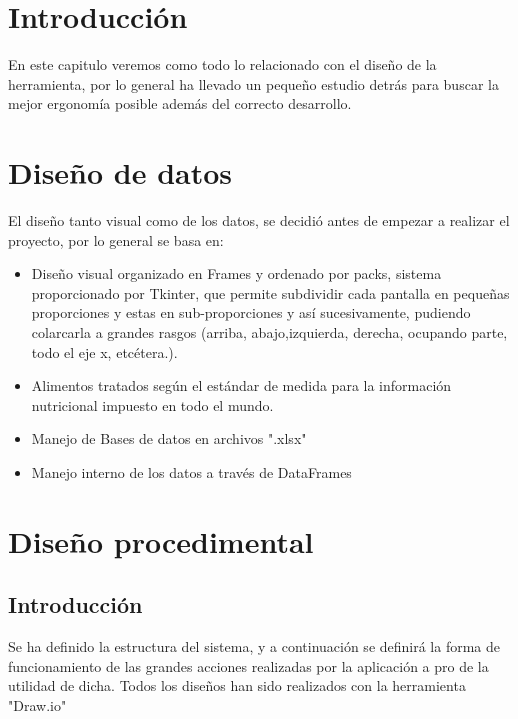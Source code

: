 
\section{Introducción}
En este capitulo veremos como todo lo relacionado con el diseño de la herramienta, por lo general ha llevado un pequeño estudio detrás para buscar la mejor ergonomía posible además del correcto desarrollo.
\section{Diseño de datos}
El diseño tanto visual como de los datos, se decidió antes de empezar a realizar el proyecto, por lo general se basa en:
\begin{itemize}
\item Diseño visual organizado en Frames y ordenado por packs, sistema proporcionado por Tkinter, que permite subdividir cada pantalla en pequeñas proporciones y estas en sub-proporciones y así sucesivamente, pudiendo colarcarla a grandes rasgos (arriba, abajo,izquierda, derecha, ocupando parte, todo el eje x, etcétera.).
\item Alimentos tratados según el estándar de medida para la información nutricional impuesto en todo el mundo.
\item Manejo de Bases de datos en archivos ".xlsx"
\item Manejo interno de los datos a través de DataFrames
\end{itemize}
\section{Diseño procedimental}
\subsection{Introducción}
Se ha definido la estructura del sistema, y a continuación se definirá la forma de funcionamiento de las grandes acciones realizadas por la aplicación a pro de la utilidad de dicha. Todos los diseños han sido realizados con la herramienta "Draw.io" \cite{herramientoUML}
